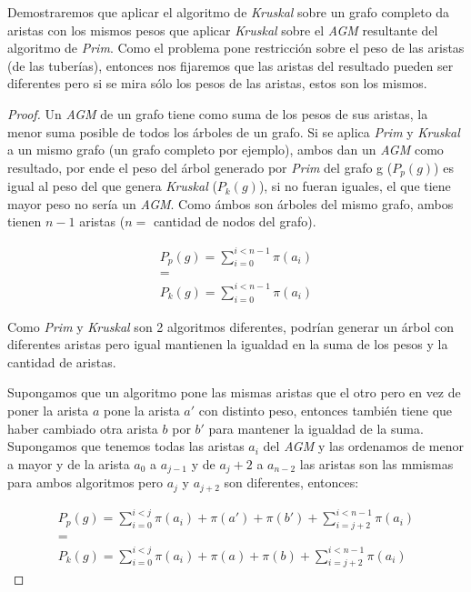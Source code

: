 Demostraremos que aplicar el algoritmo de \emph{Kruskal} sobre un grafo completo da aristas con los mismos pesos que aplicar \emph{Kruskal} sobre el \emph{AGM} resultante del algoritmo de \emph{Prim}. Como el problema pone restricci\'on sobre el peso de las aristas (de las tuber\'ias), entonces nos fijaremos que las aristas del resultado pueden ser diferentes pero si se mira s\'olo los pesos de las aristas, estos son los mismos.

\begin{proof}
	Un \emph{AGM} de un grafo tiene como suma de los pesos de sus aristas, la menor suma posible de todos los \'arboles de un grafo. Si se aplica \emph{Prim} y \emph{Kruskal} a un mismo grafo (un grafo completo por ejemplo), ambos dan un \emph{AGM} como resultado, por ende el peso del \'arbol generado por \emph{Prim} del grafo g ($P_p(g)$) es igual al peso del que genera \emph{Kruskal} ($P_k(g)$), si no fueran iguales, el que tiene mayor peso no ser\'ia un \emph{AGM}. Como \'ambos son \'arboles del mismo grafo, ambos tienen $n-1$ aristas ($n = $ cantidad de nodos del grafo).

	\begin{equation*}
	\begin{split}
		P_p(g) = \sum_{i = 0}^{i < n - 1} \pi(a_i)\\
		=\\
		P_k(g) = \sum_{i = 0}^{i < n - 1} \pi(a_i)
	\end{split}
	\end{equation*}

Como \emph{Prim} y \emph{Kruskal} son 2 algoritmos diferentes, podr\'ian generar un \'arbol con diferentes aristas pero igual mantienen la igualdad en la suma de los pesos y la cantidad de aristas.

Supongamos que un algoritmo pone las mismas aristas que el otro pero en vez de poner la arista $a$ pone la arista $a'$ con distinto peso, entonces tambi\'en tiene que haber cambiado otra arista $b$ por $b'$ para mantener la igualdad de la suma. Supongamos que tenemos todas las aristas $a_i$ del \emph{AGM} y las ordenamos de menor a mayor y de la arista $a_0$ a $a_{j-1}$ y de $a_j+2$ a $a_{n-2}$ las aristas son las mmismas para ambos algoritmos pero $a_j$ y $a_{j+2}$ son diferentes, entonces:

	\begin{equation*}
	\begin{split}
		P_p(g) = \sum_{i = 0}^{i < j} \pi(a_i) + \pi(a') + \pi(b') + \sum_{i = j + 2}^{i < n - 1} \pi(a_i) \\
		=\\
		P_k(g) = \sum_{i = 0}^{i < j} \pi(a_i) + \pi(a) + \pi(b) + \sum_{i = j + 2}^{i < n - 1} \pi(a_i)
	\end{split}
	\end{equation*}


\end{proof}
